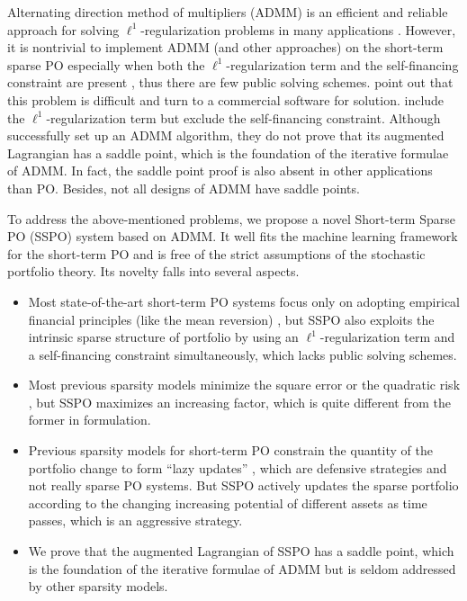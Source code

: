 \documentclass[twoside,11pt]{article}
\begin{document}
Alternating direction method of multipliers (ADMM) \citep{admm} is an efficient and reliable approach for solving $\ell^1$-regularization problems in many applications \citep{MLCS,SSSC}. However, it is nontrivial to implement ADMM (and other approaches) on the short-term sparse PO especially when both the $\ell^1$-regularization term and the self-financing constraint are present \citep{doubleregu}, thus there are few public solving schemes. \citet{doubleregu} point out that this problem is difficult and turn to a commercial software for solution. \citet{enetmeanvariance} include the $\ell^1$-regularization term but exclude the self-financing constraint. Although \citet{olazyupdate} successfully set up an ADMM algorithm, they do not prove that its augmented Lagrangian has a saddle point, which is the foundation of the iterative formulae of ADMM. In fact, the saddle point proof is also absent in other applications \citep{itershrin,multclassimg} than PO. Besides, not all designs of ADMM have saddle points.

To address the above-mentioned problems, we propose a novel Short-term Sparse PO (SSPO) system based on ADMM. It well fits the machine learning framework for the short-term PO and is free of the strict assumptions of the stochastic portfolio theory. Its novelty falls into several aspects.
\begin{itemize}
\item Most state-of-the-art short-term PO systems focus only on adopting empirical financial principles (like the mean reversion) \citep{PAMR,CWMR,OLMAR,RMR2}, but SSPO also exploits the intrinsic sparse structure of portfolio by using an $\ell^1$-regularization term and a self-financing constraint simultaneously, which lacks public solving schemes.
\item Most previous sparsity models minimize the square error \citep{sparsepo,regpo,DCC,multclassimg} or the quadratic risk \citep{sparsepo,enetmeanvariance}, but SSPO maximizes an increasing factor, which is quite different from the former in formulation.
\item Previous sparsity models for short-term PO constrain the quantity of the portfolio change to form ``lazy updates'' \citep{olazyupdate,doubleregu}, which are defensive strategies and not really sparse PO systems. But SSPO actively updates the sparse portfolio according to the changing increasing potential of different assets as time passes, which is an aggressive strategy.
\item We prove that the augmented Lagrangian of SSPO has a saddle point, which is the foundation of the iterative formulae of ADMM but is seldom addressed by other sparsity models.
\end{itemize}
\end{document}
